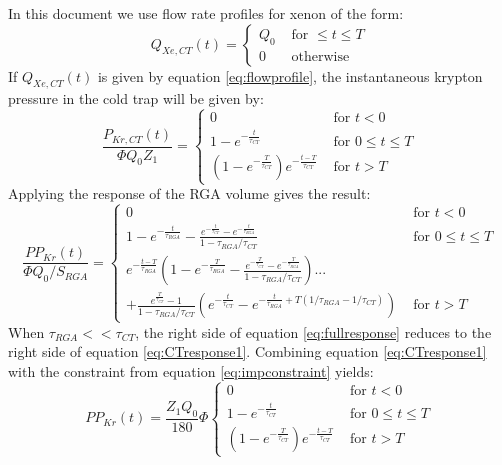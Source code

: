In this document we use flow rate profiles for xenon of the form:
\begin{equation}
\label{eq:flowprofile}
Q_{Xe,CT}(t) =
  \begin{cases}
    Q_0&\textrm{ for } \leq t\leq T\\
    0     &\textrm{ otherwise}
  \end{cases}
\end{equation}
If $Q_{Xe,CT}(t)$ is given by equation \ref{eq:flowprofile}, the instantaneous krypton pressure in the cold trap will be given by: 
\begin{equation}
\label{eq:CTresponse1}
\frac{P_{Kr,CT}(t)}{\Phi Q_0Z_1}=
\begin{cases}
0 & \textrm{ for } t<0\\
1-e^{-\frac{t}{\tau_{CT}}} & \textrm{ for } 0\leq t \leq T\\
(1-e^{-\frac{T}{\tau_{CT}}})e^{-\frac{t-T}{\tau_{CT}}}& \textrm{ for }  t > T
\end{cases}
\end{equation} 
Applying the response of the RGA volume gives the result:
\begin{equation}
\label{eq:fullresponse}
\frac{PP_{Kr}(t)}{\Phi Q_0 /S_{RGA}}=
\begin{cases}
0 & \textrm{ for } t<0\\
1-e^{-\frac{t}{\tau_{RGA}}}-\frac{e^{-\frac{t}{\tau_{CT}}}-e^{-\frac{t}{\tau_{RGA}}}}{1-\tau_{RGA}/\tau_{CT}} & \textrm{ for } 0\leq t \leq T\\
e^{-\frac{t-T}{\tau_{RGA}}}(1-e^{-\frac{T}{\tau_{RGA}}}-\frac{e^{-\frac{T}{\tau_{CT}}}-e^{-\frac{T}{\tau_{RGA}}}}{1-\tau_{RGA}/\tau_{CT}} ) ...\\
 +\frac{e^{\frac{T}{\tau_{CT}}}-1}{1-\tau_{RGA}/\tau_{CT}}(e^{-\frac{t}{\tau_{CT}}}-e^{-\frac{t}{\tau_{RGA}}+T(1/\tau_{RGA}-1/\tau_{CT})}) & \textrm{ for }  t > T
\end{cases}
\end{equation} 
When $\tau_{RGA}<<\tau_{CT}$, the right side of equation \ref{eq:fullresponse} reduces to the right side of equation \ref{eq:CTresponse1}. Combining equation \ref{eq:CTresponse1} with the constraint from equation \ref{eq:impconstraint} yields:
\begin{equation}
\label{eq:CTresponse}
PP_{Kr}(t)=\frac{Z_1 Q_0}{180}\Phi
\begin{cases}
0 & \textrm{ for } t<0\\
1-e^{-\frac{t}{\tau_{CT}}} & \textrm{ for } 0\leq t \leq T\\
(1-e^{-\frac{T}{\tau_{CT}}})e^{-\frac{t-T}{\tau_{CT}}}& \textrm{ for }  t > T
\end{cases}
\end{equation} 

